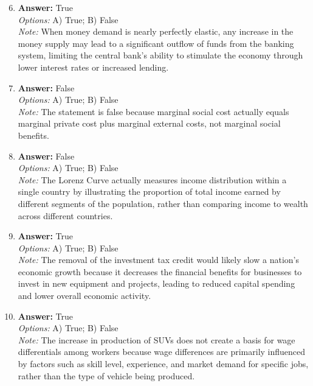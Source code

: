 \documentclass[12pt]{article}
\begin{document}
\begin{enumerate}[label=\arabic*.]
\setcounter{enumi}{5}
\item \textbf{Answer:} True
\\ \textit{Options:} A) True; B) False
\\ \textit{Note:} When money demand is nearly perfectly elastic, any increase in the money supply may lead to a significant outflow of funds from the banking system, limiting the central bank's ability to stimulate the economy through lower interest rates or increased lending.
\item \textbf{Answer:} False
\\ \textit{Options:} A) True; B) False
\\ \textit{Note:} The statement is false because marginal social cost actually equals marginal private cost plus marginal external costs, not marginal social benefits.
\item \textbf{Answer:} False
\\ \textit{Options:} A) True; B) False
\\ \textit{Note:} The Lorenz Curve actually measures income distribution within a single country by illustrating the proportion of total income earned by different segments of the population, rather than comparing income to wealth across different countries.
\item \textbf{Answer:} True
\\ \textit{Options:} A) True; B) False
\\ \textit{Note:} The removal of the investment tax credit would likely slow a nation's economic growth because it decreases the financial benefits for businesses to invest in new equipment and projects, leading to reduced capital spending and lower overall economic activity.
\item \textbf{Answer:} True
\\ \textit{Options:} A) True; B) False
\\ \textit{Note:} The increase in production of SUVs does not create a basis for wage differentials among workers because wage differences are primarily influenced by factors such as skill level, experience, and market demand for specific jobs, rather than the type of vehicle being produced.
\end{enumerate}
\end{document}
